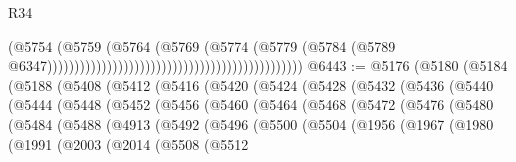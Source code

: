 \begin{lexlean}{R34}
\begin{coremodule}
                                                                                  (@5754
                                                                                    (@5759
                                                                                      (@5764
                                                                                        (@5769
                                                                                          (@5774
                                                                                            (@5779
                                                                                              (@5784
                                                                                                (@5789
                                                                                                  @6347)))))))))))))))))))))))))))))))))))))))))))))))
@6443 := @5176
    (@5180
      (@5184
        (@5188
          (@5408
            (@5412
              (@5416
                (@5420
                  (@5424
                    (@5428
                      (@5432
                        (@5436
                          (@5440
                            (@5444
                              (@5448
                                (@5452
                                  (@5456
                                    (@5460
                                      (@5464
                                        (@5468
                                          (@5472
                                            (@5476
                                              (@5480
                                                (@5484
                                                  (@5488
                                                    (@4913
                                                      (@5492
                                                        (@5496
                                                          (@5500
                                                            (@5504
                                                              (@1956
                                                                (@1967
                                                                  (@1980
                                                                    (@1991
                                                                      (@2003
                                                                        (@2014
                                                                          (@5508
                                                                            (@5512

\end{coremodule}
\end{lexlean}
